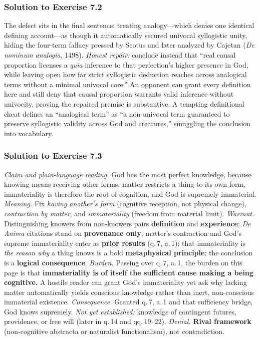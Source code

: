 \subsubsection*{Solution to Exercise 7.2}
The defect sits in the final sentence: treating analogy---which denies one identical defining account---as though it automatically secured univocal syllogistic unity, hiding the four-term fallacy pressed by Scotus and later analyzed by Cajetan (\emph{De nominum analogia}, 1498). \emph{Honest repair:} conclude instead that ``real causal proportion licenses a \emph{quia} inference to that perfection's higher presence in God, while leaving open how far strict syllogistic deduction reaches across analogical terms without a minimal univocal core.'' An opponent can grant every definition here and still deny that causal proportion warrants valid inference without univocity, proving the repaired premise is substantive. A tempting definitional cheat defines an ``analogical term'' as ``a non-univocal term guaranteed to preserve syllogistic validity across God and creatures,'' smuggling the conclusion into vocabulary.

\subsubsection*{Solution to Exercise 7.3}
\emph{Claim and plain-language reading.} God has the most perfect knowledge, because knowing means receiving other forms, matter restricts a thing to its own form, immateriality is therefore the root of cognition, and God is supremely immaterial. \emph{Meaning.} Fix \emph{having another's form} (cognitive reception, not physical change), \emph{contraction by matter}, and \emph{immateriality} (freedom from material limit). \emph{Warrant.} Distinguishing knowers from non-knowers pairs \textbf{definition} and \textbf{experience}; \emph{De Anima} citations stand on \textbf{provenance only}; matter's contraction and God's supreme immateriality enter as \textbf{prior results} (q.\,7, a.\,1); that immateriality is \emph{the reason why} a thing knows is a bold \textbf{metaphysical principle}; the conclusion is a \textbf{logical consequence}. \emph{Burden.} Passing over q.\,7, a.\,1, the burden on this page is that \textbf{immateriality is of itself the sufficient cause making a being cognitive.} A hostile reader can grant God's immateriality yet ask why lacking matter automatically yields conscious knowledge rather than inert, non-conscious immaterial existence. \emph{Consequence.} Granted q.\,7, a.\,1 and that sufficiency bridge, God knows supremely. \emph{Not yet established:} knowledge of contingent futures, providence, or free will (later in q.\,14 and qq.\,19--22). \emph{Denial.} \textbf{Rival framework} (non-cognitive abstracta or naturalist functionalism), not contradiction.

